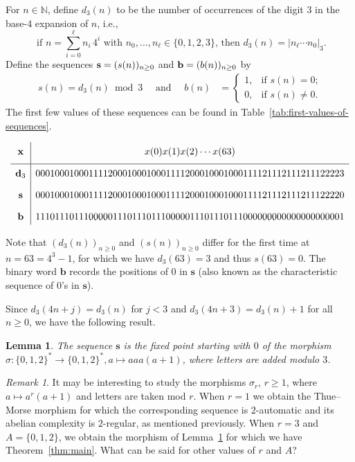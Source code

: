\documentclass[12pt]{article}
\theoremstyle{plain}
\newtheorem{lemma}[theorem]{Lemma}
\theoremstyle{definition}
\theoremstyle{remark}
\newtheorem{remark}[theorem]{Remark}
\newcommand{\N}{\mathbb{N}}
\numberwithin{equation}{section}
\begin{document}
For $n\in\N$, define $d_3(n)$ to be the number of occurrences of the digit $3$ in the base-$4$ expansion of $n$, i.e.,
\[
\text{ if }n=\sum_{i=0}^{\ell} n_i\, 4^i \text{ with }n_0,\ldots,n_\ell\in\{0,1,2,3\}\text{, then }d_3(n)=\lvert n_\ell\cdots n_0\rvert_3.
\]
Define the sequences ${\bf s} = (s(n))_{n \geq 0}$ 
and ${\bf b} = (b(n))_{n \geq 0 }$ by
\begin{align*}
 s(n)=d_3(n)\bmod3 \quad\text{ and }\quad
 b(n) &=\begin{cases}
 1, & \text{if $s(n)=0$;}\\
 0, & \text{if $s(n)\neq 0$.}\end{cases}
\end{align*}
The first few values of these sequences can be found in Table~\ref{tab:first-values-of-sequences}. 
\begin{table}[H]
    \centering
    \[
    \begin{array}{c|c}
        \mathbf{x} & x(0)x(1)x(2)\cdots x(63) \\[1ex]
        \hline
        \mathbf{d}_3 & \renewcommand{\arraystretch}{1.5}0001000100011112000100010001111200010001000111121112111211122223 \\[1ex]
        \mathbf{s} & 0001000100011112000100010001111200010001000111121112111211122220 \\[1ex]
        \mathbf{b} & 1110111011100000111011101110000011101110111000000000000000000001  
    \end{array}
    \]
    \caption{The values of the sequences $\mathbf{d}_3$, $\mathbf{s}$, and $\mathbf{b}$ for $0\le n\le 63$.}
    \label{tab:first-values-of-sequences}
\end{table}
Note that $(d_3(n))_{n\ge 0}$ and $(s(n))_{n\ge 0}$ differ for the first time at $n=63=4^3-1$, for which we have $d_3(63)=3$ and thus $s(63)=0$.
The binary word $\mathbf{b}$ records the positions
of $0$ in $\mathbf{s}$ (also known as the characteristic sequence of $0$'s in $\mathbf{s}$).

Since $d_3(4n+j)=d_3(n)$ for $j<3$ and $d_3(4n+3)=d_3(n)+1$ for all $n\ge 0$, we have the following result.

\begin{lemma}
\label{lem:s-fixed-pt}
The sequence $\mathbf{s}$ is the fixed point starting
with $0$ of the morphism $\sigma \colon \{0,1,2\}^* \to \{0,1,2\}^*, a \mapsto aaa(a+1)$, where letters are added modulo $3$.
\end{lemma}

\begin{remark}
It may be interesting to study the morphisms $\sigma_r$, $r\geq 1$, where $a\mapsto a^r(a+1)$ and letters are taken mod $r$. When $r=1$ we obtain the Thue--Morse morphism for which the corresponding sequence is $2$-automatic and its abelian complexity is $2$-regular, as mentioned previously. When $r=3$ and $A=\{0,1,2\}$, we obtain the morphism of Lemma~\ref{lem:s-fixed-pt} for which we have Theorem~\ref{thm:main}. What can be said for other values of $r$ and $A$?
\end{remark}
\end{document}
